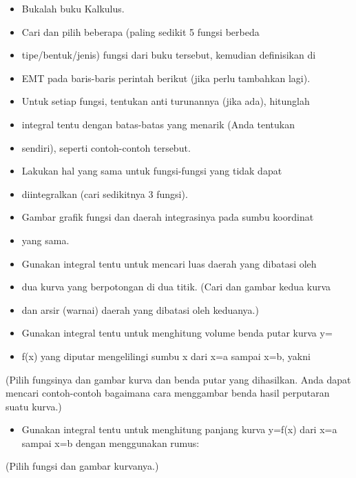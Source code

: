 \documentclass[
]{book}
\providecommand{\tightlist}{%
  \setlength{\itemsep}{0pt}\setlength{\parskip}{0pt}}
\begin{document}
\begin{itemize}
\item
  Bukalah buku Kalkulus.
\item
  Cari dan pilih beberapa (paling sedikit 5 fungsi berbeda
\item
  tipe/bentuk/jenis) fungsi dari buku tersebut, kemudian definisikan di
\item
  EMT pada baris-baris perintah berikut (jika perlu tambahkan lagi).
\item
  Untuk setiap fungsi, tentukan anti turunannya (jika ada), hitunglah
\item
  integral tentu dengan batas-batas yang menarik (Anda tentukan
\item
  sendiri), seperti contoh-contoh tersebut.
\item
  Lakukan hal yang sama untuk fungsi-fungsi yang tidak dapat
\item
  diintegralkan (cari sedikitnya 3 fungsi).
\item
  Gambar grafik fungsi dan daerah integrasinya pada sumbu koordinat
\item
  yang sama.
\item
  Gunakan integral tentu untuk mencari luas daerah yang dibatasi oleh
\item
  dua kurva yang berpotongan di dua titik. (Cari dan gambar kedua kurva
\item
  dan arsir (warnai) daerah yang dibatasi oleh keduanya.)
\item
  Gunakan integral tentu untuk menghitung volume benda putar kurva y=
\item
  f(x) yang diputar mengelilingi sumbu x dari x=a sampai x=b, yakni
\end{itemize}

(Pilih fungsinya dan gambar kurva dan benda putar yang dihasilkan. Anda dapat mencari contoh-contoh bagaimana cara menggambar benda hasil perputaran suatu kurva.)

\begin{itemize}
\tightlist
\item
  Gunakan integral tentu untuk menghitung panjang kurva y=f(x) dari x=a sampai x=b dengan menggunakan rumus:
\end{itemize}

(Pilih fungsi dan gambar kurvanya.)
\end{document}
